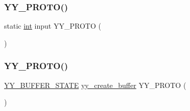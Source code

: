 \mbox{\label{expr-lex_8cpp_ad0c2268922fe79170ffa21498ef4f02d}} 
\subsubsection{\texorpdfstring{Y\+Y\+\_\+\+P\+R\+O\+T\+O()}{YY\_PROTO()}\hspace{0.1cm}{\footnotesize\ttfamily [3/9]}}
{\footnotesize\ttfamily static \mbox{\hyperlink{_util_8cpp_a0ef32aa8672df19503a49fab2d0c8071}{int}} input Y\+Y\+\_\+\+P\+R\+O\+TO (\begin{DoxyParamCaption}\item[{(void)}]{ }\end{DoxyParamCaption})}

\mbox{\label{expr-lex_8cpp_aa2feac785a778f388f5789c00eccf8c3}} 
\subsubsection{\texorpdfstring{Y\+Y\+\_\+\+P\+R\+O\+T\+O()}{YY\_PROTO()}\hspace{0.1cm}{\footnotesize\ttfamily [4/9]}}
{\footnotesize\ttfamily \mbox{\hyperlink{expr-lex_8cpp_a4e5bd2d129903df83f3d13effaf8f3e4}{Y\+Y\+\_\+\+B\+U\+F\+F\+E\+R\+\_\+\+S\+T\+A\+TE}} \mbox{\hyperlink{expr-lex_8cpp_a55588ac24161be2160e907e019dcae5c}{yy\+\_\+create\+\_\+buffer}} Y\+Y\+\_\+\+P\+R\+O\+TO (\begin{DoxyParamCaption}\item[{(F\+I\+LE $\ast$\mbox{\hyperlink{expr-lex_8cpp_a702945180aa732857b380a007a7e2a21}{file}}, \mbox{\hyperlink{_util_8cpp_a0ef32aa8672df19503a49fab2d0c8071}{int}} \mbox{\hyperlink{expr-lex_8cpp_ab7d671599a7b25ca99a487fa341bc33a}{size}})}]{ }\end{DoxyParamCaption})}

\mbox{\label{expr-lex_8cpp_af3396691b9b779b13d6cc623715bb1dd}} 
